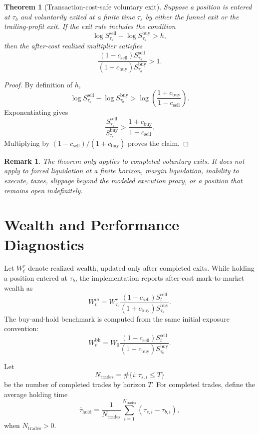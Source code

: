 \documentclass[11pt]{article}
\newtheorem{theorem}{Theorem}
\newtheorem{remark}{Remark}
\begin{document}
\begin{theorem}[Transaction-cost-safe voluntary exit]
Suppose a position is entered at \(\tau_b\) and voluntarily exited at a finite time \(\tau_s\) by either the funnel exit or the trailing-profit exit. If the exit rule includes the condition
\[
\log S_{\tau_s}^{\mathrm{sell}}
-
\log S_{\tau_b}^{\mathrm{buy}}>h,
\]
then the after-cost realized multiplier satisfies
\[
\frac{(1-c_{\mathrm{sell}})S_{\tau_s}^{\mathrm{sell}}}
{(1+c_{\mathrm{buy}})S_{\tau_b}^{\mathrm{buy}}}>1.
\]
\end{theorem}

\begin{proof}
By definition of \(h\),
\[
\log S_{\tau_s}^{\mathrm{sell}}
-
\log S_{\tau_b}^{\mathrm{buy}}
>
\log\left(\frac{1+c_{\mathrm{buy}}}{1-c_{\mathrm{sell}}}\right).
\]
Exponentiating gives
\[
\frac{S_{\tau_s}^{\mathrm{sell}}}{S_{\tau_b}^{\mathrm{buy}}}
>
\frac{1+c_{\mathrm{buy}}}{1-c_{\mathrm{sell}}}.
\]
Multiplying by \((1-c_{\mathrm{sell}})/(1+c_{\mathrm{buy}})\) proves the claim.
\end{proof}

\begin{remark}
The theorem only applies to completed voluntary exits. It does not apply to forced liquidation at a finite horizon, margin liquidation, inability to execute, taxes, slippage beyond the modeled execution proxy, or a position that remains open indefinitely.
\end{remark}

\section{Wealth and Performance Diagnostics}

Let \(W_t^r\) denote realized wealth, updated only after completed exits. While holding a position entered at \(\tau_b\), the implementation reports after-cost mark-to-market wealth as
\[
W_t^m
=
W_{\tau_b}^r
\frac{(1-c_{\mathrm{sell}})S_t^{\mathrm{sell}}}
{(1+c_{\mathrm{buy}})S_{\tau_b}^{\mathrm{buy}}}.
\]
The buy-and-hold benchmark is computed from the same initial exposure convention:
\[
W_t^{\mathrm{bh}}
=
W_0
\frac{(1-c_{\mathrm{sell}})S_t^{\mathrm{sell}}}
{(1+c_{\mathrm{buy}})S_{\tau_0}^{\mathrm{buy}}}.
\]

Let
\[
N_{\mathrm{trades}}
=
\#\{i:\tau_{s,i}\leq T\}
\]
be the number of completed trades by horizon \(T\). For completed trades, define the average holding time
\[
\bar\tau_{\mathrm{hold}}
=
\frac{1}{N_{\mathrm{trades}}}
\sum_{i=1}^{N_{\mathrm{trades}}}
(\tau_{s,i}-\tau_{b,i}),
\]
when \(N_{\mathrm{trades}}>0\).
\end{document}
